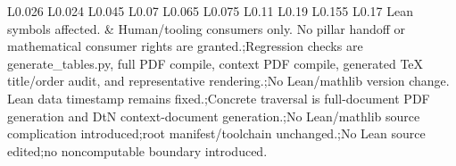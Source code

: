 \begin{longtable}{L{0.026\linewidth} L{0.024\linewidth} L{0.045\linewidth} L{0.07\linewidth} L{0.065\linewidth} L{0.075\linewidth} L{0.11\linewidth} L{0.19\linewidth} L{0.155\linewidth} L{0.17\linewidth}}
Lean symbols affected. & Human/\allowbreak{}tooling consumers only. No pillar handoff or mathematical consumer rights are granted.;\newline Regression checks are generate\_tables.py, full PDF compile, context PDF compile, generated TeX title/\allowbreak{}order audit, and representative rendering.;\newline No Lean/\allowbreak{}mathlib version change. Lean data timestamp remains fixed.;\newline Concrete traversal is full-document PDF generation and DtN context-document generation.;\newline No Lean/\allowbreak{}mathlib source complication introduced;\newline root manifest/\allowbreak{}toolchain unchanged.;\newline No Lean source edited;\newline no noncomputable boundary introduced.\\
\hline
\addlinespace[0.24em]

\end{longtable}
